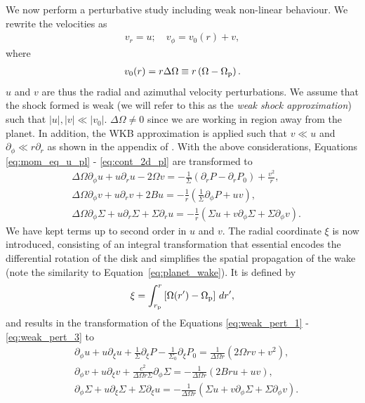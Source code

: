 We now perform a perturbative study including weak non-linear behaviour.
We rewrite the velocities as 
\begin{align}
    v_r = u; \quad v_\phi = v_0(r) + v,
\end{align}
where
\begin{align}
    v_0(r) = r \Delta \Omega \equiv r \left( \Omega - \Omega_{\rm p} \right).
\end{align}
$u$ and $v$ are thus the radial and azimuthal velocity perturbations.
We assume that the shock formed is weak (we will refer to this as the \textit{weak shock approximation}) such that $|u|,|v| \ll |v_0|$. 
$\Delta \Omega \neq 0$ since we are working in region away from the planet.
In addition, the WKB approximation is applied such that $v \ll u$ and $\partial_\phi \ll r \partial_r$ as shown in the appendix of \citet{rafikov2002a}.
With the above considerations, Equations \eqref{eq:mom_eq_u_pl} - \eqref{eq:cont_2d_pl} are transformed to 
\begin{align}
    &\Delta \Omega \partial_\phi u + u \partial_r u - 2 \Omega v = - \frac{1}{\Sigma} \left( \partial_r P - \partial_r P_0  \right) + \frac{v^2}{r}, \label{eq:weak_pert_1} \\
    &\Delta \Omega \partial_\phi v + u \partial_r v + 2Bu = - \frac{1}{r} \left( \frac{1}{\Sigma} \partial_\phi P +u v \right), \label{eq:weak_pert_2} \\
    &\Delta \Omega \partial_\phi \Sigma + u \partial_r \Sigma + \Sigma \partial_r u = - \frac{1}{r} \left( \Sigma u + v \partial_\phi \Sigma + \Sigma \partial_\phi v \right). \label{eq:weak_pert_3}
\end{align}
We have kept terms up to second order in $u$ and $v$.
The radial coordinate $\xi$ is now introduced, consisting of an integral transformation that essential encodes the differential rotation of the disk and simplifies the spatial propagation of the wake (note the similarity to Equation~\eqref{eq:planet_wake}).
It is defined by
\begin{align}
    \xi = \int_{r_{\rm p}}^ r \left[ \Omega(r') - \Omega_{\rm p} \right] \, dr',
\end{align}
and results in the transformation of the Equations \eqref{eq:weak_pert_1} - \eqref{eq:weak_pert_3} to
\begin{align}
    &\partial_\phi u + u \partial_\xi u + \frac{1}{\Sigma} \partial_\xi P - \frac{1}{\Sigma_0} \partial_\xi P_0 = \frac{1}{\Delta \Omega r} \left( 2 \Omega r v + v^2 \right), \label{eq:phi_xi_u} \\
    &\partial_\phi v + u \partial_\xi v + \frac{c^2}{\Delta \Omega r \Sigma} \partial_\phi \Sigma = - \frac{1}{\Delta \Omega r} \left( 2 B r u +uv \right), \label{eq:phi_xi_v} \\
    &\partial_\phi \Sigma + u \partial_\xi \Sigma + \Sigma \partial_\xi u = -\frac{1}{\Delta \Omega r} \left( \Sigma u + v \partial_\phi \Sigma + \Sigma \partial_\phi v \right). \label{eq:phi_xi_sigma}
\end{align}
